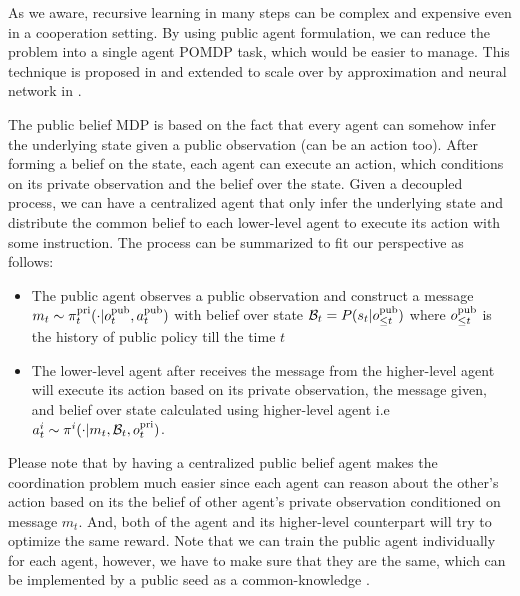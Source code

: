 \label{sec:chap5-pub-belief-MDP}
As we aware, recursive learning in many steps can be complex and expensive even in a cooperation setting. By using public agent formulation, we can reduce the problem into a single agent POMDP task, which would be easier to manage. This technique is proposed in \cite{nayyar2013decentralized} and extended to scale over by approximation and neural network in \cite{foerster2018bayesian}. 

The public belief MDP is based on the fact that every agent can somehow infer the underlying state given a public observation (can be an action too). After forming a belief on the state, each agent can execute an action, which conditions on its private observation and the belief over the state. Given a decoupled process, we can have a centralized agent that only infer the underlying state and distribute the common belief to each lower-level agent to execute its action with some instruction. The process can be summarized to fit our perspective as follows:
\begin{itemize}
    \item The public agent observes a public observation and construct a message $m_t \sim \pi^{\operatorname{pri}}_t(\cdot | o^{\operatorname{pub}}_t, a^{\operatorname{pub}}_t)$ with belief over state $\mathcal{B}_t = P(s_t | o^{\operatorname{pub}}_{\le t})$ where $o^{\operatorname{pub}}_{\le t}$ is the history of public policy till the time $t$
    \item The lower-level agent after receives the message from the higher-level agent will execute its action based on its private observation, the message given, and belief over state calculated using higher-level agent i.e $a^i_t \sim \pi^i(\cdot | m_t, \mathcal{B}_t, o^{\operatorname{pri}}_t)$. 
\end{itemize}
Please note that by having a centralized public belief agent makes the coordination problem much easier since each agent can reason about the other's action based on its the belief of other agent's private observation conditioned on message $m_t$. And, both of the agent and its higher-level counterpart will try to optimize the same reward. Note that we can train the public agent individually for each agent, however, we have to make sure that they are the same, which can be implemented by a public seed as a common-knowledge \cite{foerster2018bayesian}.
